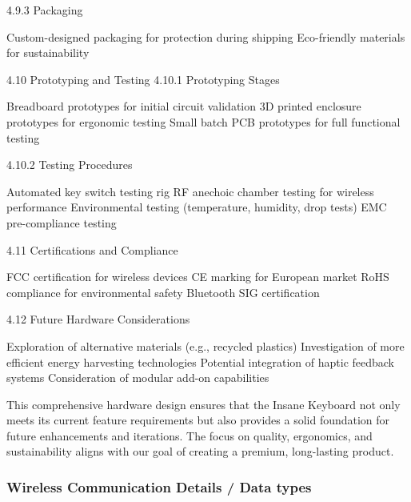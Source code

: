 \documentclass[a4paper,11pt]{article}%
\begin{document}
4.9.3 Packaging

Custom-designed packaging for protection during shipping
Eco-friendly materials for sustainability

4.10 Prototyping and Testing
4.10.1 Prototyping Stages

Breadboard prototypes for initial circuit validation
3D printed enclosure prototypes for ergonomic testing
Small batch PCB prototypes for full functional testing

4.10.2 Testing Procedures

Automated key switch testing rig
RF anechoic chamber testing for wireless performance
Environmental testing (temperature, humidity, drop tests)
EMC pre-compliance testing

4.11 Certifications and Compliance

FCC certification for wireless devices
CE marking for European market
RoHS compliance for environmental safety
Bluetooth SIG certification

4.12 Future Hardware Considerations

Exploration of alternative materials (e.g., recycled plastics)
Investigation of more efficient energy harvesting technologies
Potential integration of haptic feedback systems
Consideration of modular add-on capabilities

This comprehensive hardware design ensures that the Insane Keyboard not only meets its current feature requirements but also provides a solid foundation for future enhancements and iterations. The focus on quality, ergonomics, and sustainability aligns with our goal of creating a premium, long-lasting product.

\subsubsection{Wireless Communication Details / Data types}
\end{document}
